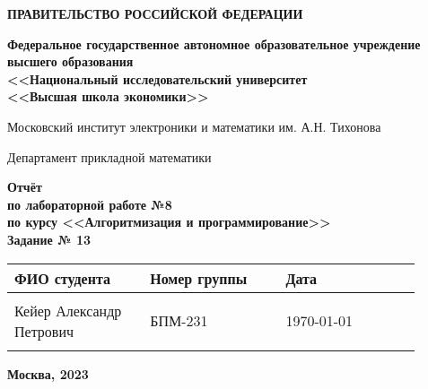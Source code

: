 \documentclass[12pt]{article}
\begin{document}
	
	\thispagestyle{empty}
	\begin{center}
		\textbf{ПРАВИТЕЛЬСТВО РОССИЙСКОЙ ФЕДЕРАЦИИ}
		
		\vspace{5ex}
		
		\textbf{Федеральное государственное автономное образовательное учреждение \\ высшего образования \\ <<Национальный исследовательский университет \\ <<Высшая школа экономики>>}
	\end{center}
	\vspace{5ex}
	
	\begin{center}
		Московский институт электроники и математики им. А.Н. Тихонова  
		
		\vspace{5ex}
		
		Департамент прикладной математики
		
		\vspace{10ex}
		\textbf{Отчёт \\ по лабораторной работе №8 \\ по курсу <<Алгоритмизация и программирование>> \\ Задание № 13}
		\vspace{7ex}
		
	\end{center}
	
	\begin{center} 
		\begin{tabular}{| p{0.3\linewidth}| p{0.3\linewidth}| p{0.3\linewidth}|}
			\hline	
			ФИО студента & Номер группы & Дата \\  \hline
			& & \\  
			Кейер Александр \newline Петрович & БПМ-231 & \today\\  
			& & \\  \hline		
		\end{tabular}
	\end{center}
	
	\begin{center}
		\vspace{3ex}
		
		\vfill
		
		\normalsize
		
		\textbf{Москва, 2023}
	\end{center}
	
\end{document}
